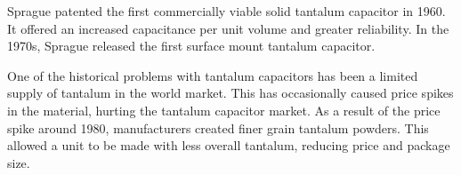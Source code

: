 \noindent Sprague patented the first commercially viable solid tantalum capacitor in 1960. It offered an increased capacitance per unit volume and greater reliability.\cite{charTant} In the 1970s, Sprague released the first surface mount tantalum capacitor.\cite{spragueHist}

\noindent One of the historical problems with tantalum capacitors has been a limited supply of tantalum in the world market. This has occasionally caused price spikes in the material, hurting the tantalum capacitor market. As a result of the price spike around 1980, manufacturers created finer grain tantalum powders. This allowed a unit to be made with less overall tantalum, reducing price and package size.\cite[ch~3.1]{tantMis}
